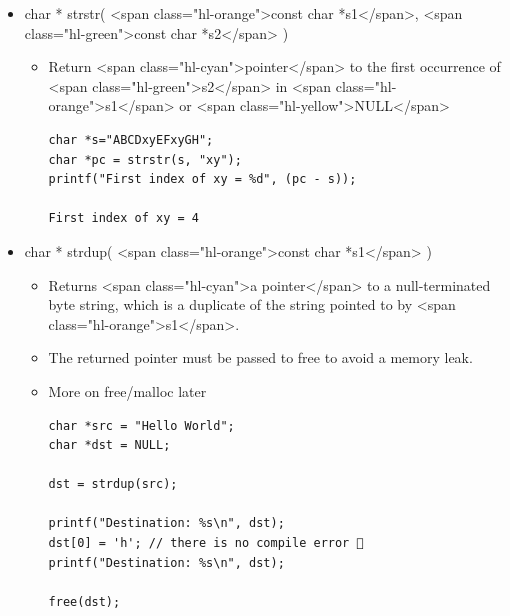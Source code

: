 \documentclass{../c-lecture}
\begin{document}
\begin{frame}[fragile]
  \begin{itemize}
    \item
      char * strstr( <span class="hl-orange">const char *s1</span>,
      <span class="hl-green">const char *s2</span>
      )

    \begin{itemize}
      \item
        Return <span class="hl-cyan">pointer</span> to the first occurrence of
        <span class="hl-green">s2</span> in
        <span class="hl-orange">s1</span> or
        <span class="hl-yellow">NULL</span>

      \begin{verbatim}
char *s="ABCDxyEFxyGH";
char *pc = strstr(s, "xy");
printf("First index of xy = %d", (pc - s));

First index of xy = 4
      \end{verbatim}
    \end{itemize}
  \end{itemize}
\end{frame}

\begin{frame}[fragile]
  \begin{itemize}
    \item
      char * strdup(
      <span class="hl-orange">const char *s1</span>
      )

    \begin{itemize}
      \item
        Returns <span class="hl-cyan">a pointer</span> to a null-terminated
        byte string, which is a duplicate of the string pointed to by
        <span class="hl-orange">s1</span>.

      \item
        The returned pointer must be passed to free to avoid a memory leak.

      \item More on free/malloc later
      \begin{verbatim}
char *src = "Hello World";
char *dst = NULL;

dst = strdup(src);

printf("Destination: %s\n", dst);
dst[0] = 'h'; // there is no compile error 🕺
printf("Destination: %s\n", dst);

free(dst);
      \end{verbatim}
    \end{itemize}
  \end{itemize}
\end{frame}
\end{document}

